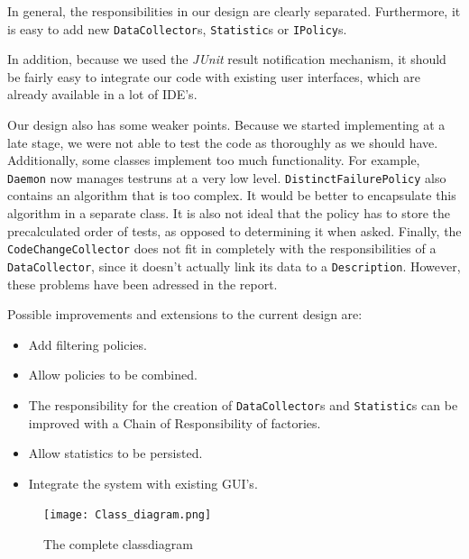 \documentclass[i2]{oss}
\newcommand{\class}[1]{\texttt{#1}}
\newcommand{\junit}{\emph{JUnit }}
\begin{document}
In general, the responsibilities in our design are clearly separated.
Furthermore, it is easy to add new \class{DataCollector}s, \class{Statistic}s or \class{IPolicy}s.

In addition, because we used the \junit result notification mechanism, it should be fairly easy to 
integrate our code with existing user interfaces, which are already available in a lot of IDE's.

Our design also has some weaker points. 
Because we started implementing at a late stage, we were not able to test the code as thoroughly as we should have.
Additionally, some classes implement too much functionality.
For example, \class{Daemon} now manages testruns at a very low level.
\class{DistinctFailurePolicy} also contains an algorithm that is too complex.
It would be better to encapsulate this algorithm in a separate class.
It is also not ideal that the policy has to store the precalculated order of tests, as opposed to determining it when asked.
Finally, the \class{CodeChangeCollector} does not fit in completely with the responsibilities of a \class{DataCollector}, since it doesn't actually link its data to a \class{Description}.
However, these problems have been adressed in the report.

Possible improvements and extensions to the current design are:
\begin{itemize}
\item Add filtering policies.
\item Allow policies to be combined.
\item The responsibility for the creation of \class{DataCollector}s and \class{Statistic}s can be improved with a Chain of Responsibility of factories.
\item Allow statistics to be persisted.
\item Integrate the system with existing GUI's.
\end{itemize}


\begin{figure}
\begin{center}
    \texttt{[image: Class\_diagram.png]}
    \caption{The complete classdiagram}
	\label{fig:classdiagram}
\end{center}
\end{figure}

\end{document}

